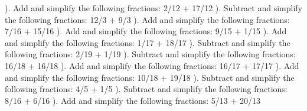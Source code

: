 \documentclass{article}%
\begin{document}
\newline%
). Add and simplify the following fractions: 2/12 + 17/12%
\newline%
\newline%
). Subtract and simplify the following fractions: 12/3 + 9/3%
\newline%
\newline%
). Add and simplify the following fractions: 7/16 + 15/16%
\newline%
\newline%
). Add and simplify the following fractions: 9/15 + 1/15%
\newline%
\newline%
). Add and simplify the following fractions: 1/17 + 18/17%
\newline%
\newline%
). Subtract and simplify the following fractions: 2/19 + 1/19%
\newline%
\newline%
). Subtract and simplify the following fractions: 16/18 + 16/18%
\newline%
\newline%
). Add and simplify the following fractions: 16/17 + 17/17%
\newline%
\newline%
). Add and simplify the following fractions: 10/18 + 19/18%
\newline%
\newline%
). Subtract and simplify the following fractions: 4/5 + 1/5%
\newline%
\newline%
). Subtract and simplify the following fractions: 8/16 + 6/16%
\newline%
\newline%
). Add and simplify the following fractions: 5/13 + 20/13%
\newline%
\newline%
\end{document}
